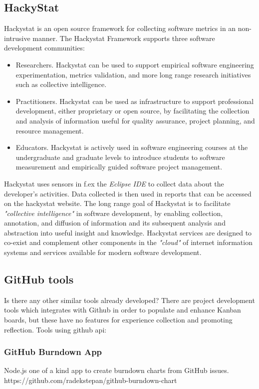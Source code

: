 \subsection{HackyStat}
Hackystat is an open source framework for collecting software metrics in an non-intrusive manner. 
The Hackystat Framework supports three software development communities:
\begin{itemize}
	\item Researchers. Hackystat can be used to support empirical software engineering experimentation, metrics validation, and more long range research initiatives such as collective intelligence.
	\item Practitioners. Hackystat can be used as infrastructure to support professional development, either proprietary or open source, by facilitating the collection and analysis of information useful for quality assurance, project planning, and resource management.
	\item Educators. Hackystat is actively used in software engineering courses at the undergraduate and graduate levels to introduce students to software measurement and empirically guided software project management.
\end{itemize}
Hackystat uses sensors in f.ex the \emph{Eclipse IDE} to collect data about the developer's activities. Data collected is then used in reports that can be accessed on the hackystat website. 
The long range goal of Hackystat is to facilitate \emph{"collective intelligence"} in software development, by enabling collection, annotation, and diffusion of information and its subsequent analysis and abstraction into useful insight and knowledge. Hackystat services are designed to co-exist and complement other components in the \emph{"cloud"} of internet information systems and services available for modern software development.\\ 

\subsection{GitHub tools}
Is there any other similar tools already developed? There are project development tools which integrates with Github in order to populate and enhance Kanban boards, but these have no features for experience collection and promoting reflection. 
Tools using github api: \\
\subsubsection{GitHub Burndown App}
Node.js one of a kind app to create burndown charts from GitHub issues. 
https://github.com/radekstepan/github-burndown-chart
